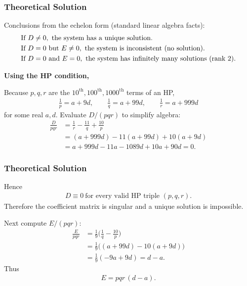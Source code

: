 \documentclass{beamer}
\theoremstyle{remark}
\numberwithin{equation}{section}
\begin{document}
\begin{frame}
\frametitle{Theoretical Solution}
Conclusions from the echelon form (standard linear algebra facts):
\begin{align}
&\text{If } D\neq 0,\ \text{the system has a unique solution.} \notag \\
&\text{If } D=0 \text{ but } E\neq 0,\ \text{the system is inconsistent (no solution).} \notag \\
&\text{If } D=0 \text{ and } E=0,\ \text{the system has infinitely many solutions (rank 2).} \notag
\end{align}


\noindent\textbf{Using the HP condition,}

Because \(p,q,r\) are the \(10^{\text{th}},100^{\text{th}},1000^{\text{th}}\) terms of an HP,
\begin{align}
\frac{1}{p}=a+9d,\qquad \frac{1}{q}=a+99d,\qquad \frac{1}{r}=a+999d
\end{align}
for some real \(a,d\). Evaluate \(D/(pqr)\) to simplify algebra:
\begin{align}
\frac{D}{pqr}
&= \frac{1}{r} - \frac{11}{q} + \frac{10}{p}
\\
&= (a+999d) - 11(a+99d) + 10(a+9d)
\\
&= a + 999d -11a -1089d +10a +90d = 0.
\end{align}

\end{frame}

\begin{frame}
\frametitle{Theoretical Solution}
Hence
\begin{align}
\boxed{D\equiv 0\ \text{for every valid HP triple }(p,q,r).}
\end{align}
Therefore the coefficient matrix is singular and a unique solution is impossible.

Next compute \(E/(pqr)\):
\begin{align}
\frac{E}{pqr}
&= \frac{1}{9}\Big(\frac{1}{q} - \frac{10}{p}\Big)
\\
&= \frac{1}{9}\big( (a+99d) - 10(a+9d)\big)
\\
&= \frac{1}{9}(-9a + 9d) = d-a.
\end{align}
Thus
\begin{align}
\boxed{E = pqr\,(d-a).}
\end{align}

\end{frame}
\end{document}
